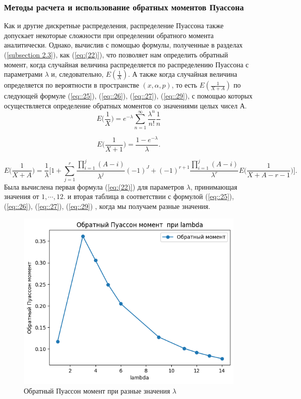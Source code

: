 \documentclass[13pt]{article}
\begin{document}
\subsubsection{Методы расчета и использование обратных моментов Пуассона}
Как и другие дискретные распределения, распределение Пуассона также допускает некоторые сложности при определении обратного момента аналитически. Однако, вычислив с помощью формулы, полученные в разделах (\ref{subsection 2.3}), как (\ref{eq:(22)}), что позволяет нам определить обратный момент, когда случайная величина распределяется по распределению Пуассона с параметрами $\lambda$ и, следовательно, $E(\frac{1}{X})$. А также когда случайная величина определяется по вероятности в пространстве $(x, \alpha, p)$, то есть $E( \frac{1}{X+A})$ по следующей формуле (\ref{eq::25}), (\ref{eq::26}), (\ref{eq::27}), (\ref{eq::29}), с помощью которых осуществляется определение обратных моментов со значениями целых чисел А.
\begin{equation*}
    E\bigg(\frac{1}{X}\bigg) = e^{-\lambda} \sum_{n=1}^{\infty} \frac{\lambda^{n}}{n!} \frac{1}{n}
\end{equation*}

\begin{equation*}
E\Big(\frac{1}{X+1}\Big)=\frac{1-e^{-\lambda}}{\lambda}.
\end{equation*}

\begin{equation*}
    E\Big(\frac{1}{X+A}\Big) = \frac{1}{\lambda}\Bigg[1+\sum_{j=1}^{r}\frac{\prod_{i=1}^{j}(A-i)}{\lambda^{j}}(-1)^{J}+(-1)^{r+1}\frac{\prod_{i=1}^{j}(A-i)}{\lambda^{r}}E\Big(\frac{1}{X+A-r-1}\Big)\Bigg].
\end{equation*}
Была вычислена первая формула (\ref{eq:(22)}) для параметров $\lambda$, принимающая значения от $1, \cdots, 12$. и вторая таблица в соответствии с формулой (\ref{eq::25}), (\ref{eq::26}), (\ref{eq::27}), (\ref{eq::29}) , когда мы получаем разные значения.

\vspace{6 mm}
\begin{figure}[htp]
    \centering
    \includegraphics[width=12cm]{images/poisson.png}
    \caption{ Обратный Пуассон момент при разные значения $\lambda$ }
    \label{poisson_fig}
\end{figure}

\end{document}
